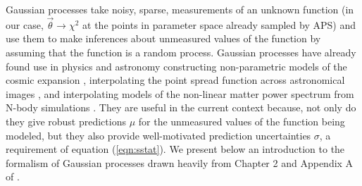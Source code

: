 \documentclass[useAMS,usenatbib]{aastex}
\begin{document}
Gaussian processes take noisy, sparse, measurements of an unknown function (in our
case, $\vec{\theta}\rightarrow\chi^2$ at
the points in parameter space already sampled by APS) and use them to
make inferences about unmeasured values of the function by assuming that the
function is a random process.  Gaussian processes have already found use in physics
and astronomy constructing non-parametric models of the cosmic expansion
\cite{ericgp}, interpolating the point spread function across 
astronomical images
\cite{psf}, and interpolating models of the non-linear matter
power spectrum from N-body simulations \cite{habib}.
They are useful in the current context because, not only do they
give robust predictions $\mu$ for the unmeasured values of the
function being modeled, but they also
provide well-motivated prediction uncertainties $\sigma$, a requirement of
equation (\ref{eqn:sstat}).  We present below an introduction to the
formalism of Gaussian processes drawn heavily
from Chapter 2 and Appendix A 
of \cite{gp}.
\end{document}
